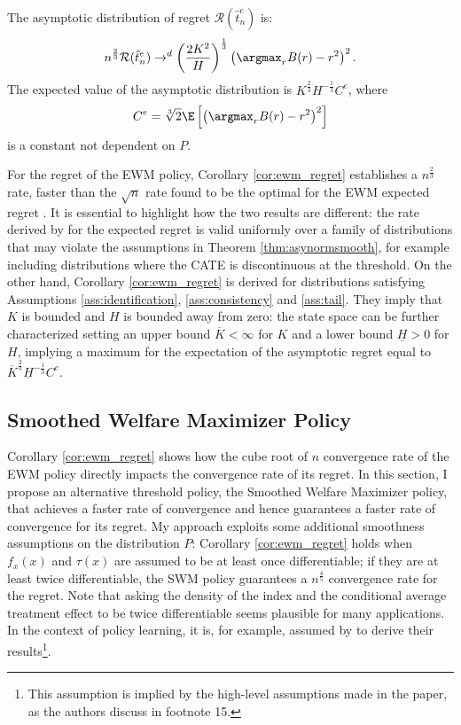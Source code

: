 {\begin{corollary} \label{cor:ewm_regret}
    The asymptotic distribution of regret $\mathcal{R}(\hat{t}^e_n)$ is:
    \begin{gather*}
        n^{\frac{2}{3}} \mathcal{R}(\hat{t}^e_n) \rightarrow^d  \left( \frac{2K^{2}}{H} \right)^\frac{1}{3}  \left( \argmax_r B(r) - r^2 \right)^2.
    \end{gather*}
    The expected value of the asymptotic distribution is $K^\frac{2}{3} H^{-\frac{1}{3}} C^e$, where $$C^e= \sqrt[3]{2} \E\left[\left( \argmax_r B(r) - r^2 \right)^2\right]$$ is a constant not dependent on $P$.
\end{corollary}

For the regret of the EWM policy, Corollary \ref{cor:ewm_regret} establishes a $n^{\frac{2}{3}}$ rate, faster than the $\sqrt{n}$ rate found to be the optimal for the EWM expected regret \citep{kitagawa2018should}. It is essential to highlight how the two results are different: the rate derived by \cite{kitagawa2018should} for the expected regret is valid uniformly over a family of distributions that may violate the assumptions in Theorem \ref{thm:asynormsmooth}, for example including distributions where the CATE is discontinuous at the threshold. On the other hand, Corollary \ref{cor:ewm_regret} is derived for distributions satisfying Assumptions \ref{ass:identification}, \ref{ass:consistency} and \ref{ass:tail}. They imply that $K$ is bounded and $H$ is bounded away from zero: the state space can be further characterized setting an upper bound $\overline{K}<\infty$ for $K$ and a lower bound $\underline{H}>0$ for $H$, implying a maximum for the expectation of the asymptotic regret equal to $\overline{K}^\frac{2}{3} \underline{H}^{-\frac{1}{3}} C^e$.

\subsection{Smoothed Welfare Maximizer Policy}

Corollary \ref{cor:ewm_regret} shows how the cube root of $n$ convergence rate of the EWM policy directly impacts the convergence rate of its regret. In this section, I propose an alternative threshold policy, the Smoothed Welfare Maximizer policy, that achieves a faster rate of convergence and hence guarantees a faster rate of convergence for its regret. My approach exploits some additional smoothness assumptions on the distribution $P$: Corollary \ref{cor:ewm_regret} holds when $f_x(x)$ and $\tau(x)$ are assumed to be at least once differentiable; if they are at least twice differentiable, the SWM policy guarantees a $n^\frac{4}{5}$ convergence rate for the regret. Note that asking the density of the index and the conditional average treatment effect to be twice differentiable seems plausible for many applications. In the context of policy learning, it is, for example, assumed by \cite{athey2021policy} to derive their results\footnote{This assumption is implied by the high-level assumptions made in the paper, as the authors discuss in footnote 15.}.

}
